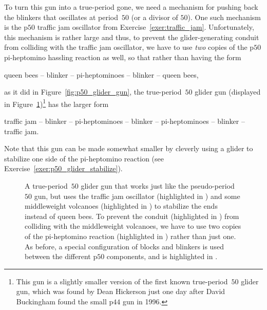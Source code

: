To turn this gun into a true-period gone, we need a mechanism for pushing back the blinkers that oscillates at period~$50$ (or a divisor of $50$). One such mechanism is the p$50$ traffic jam oscillator from Exercise~\ref{exer:traffic_jam}. Unfortunately, this mechanism is rather large and thus, to prevent the glider-generating conduit from colliding with the traffic jam oscillator, we have to use \emph{two} copies of the p$50$ pi-heptomino hassling reaction as well, so that rather than having the form

\begin{center}
	queen bees -- blinker -- pi-heptominoes -- blinker -- queen bees,
\end{center}

\noindent as it did in Figure~\ref{fig:p50_glider_gun}, the true-period~$50$ glider gun (displayed in Figure~\ref{fig:true_p50_glider_gun})\footnote{This gun is a slightly smaller version of the first known true-period~$50$ glider gun, which was found by Dean Hickerson just one day after David Buckingham found the small p$44$ gun in 1996.} has the larger form

\begin{center}
	traffic jam -- blinker -- pi-heptominoes -- blinker -- pi-heptominoes -- blinker -- traffic jam.
\end{center}

\noindent Note that this gun can be made somewhat smaller by cleverly using a glider to stabilize one side of the pi-heptomino reaction (see Exercise~\ref{exer:p50_glider_stabilize}).

\begin{figure}[!htb]
	\centering
	\caption{A true-period~$50$ glider gun that works just like the pseudo-period~$50$ gun, but uses the traffic jam oscillator (highlighted in ) and some middleweight volcanoes (highlighted in ) to stabilize the ends instead of queen bees. To prevent the conduit (highlighted in ) from colliding with the middleweight volcanoes, we have to use two copies of the pi-heptomino reaction (highlighted in ) rather than just one. As before, a special configuration of blocks and blinkers is used between the different p$50$ components, and is highlighted in .}\label{fig:true_p50_glider_gun}
\end{figure}

